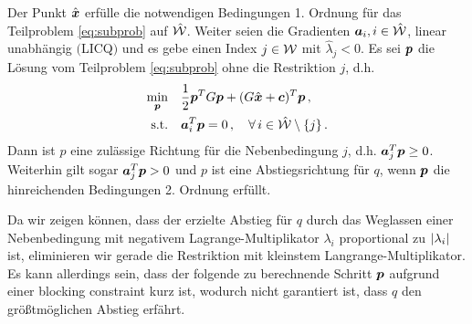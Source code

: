\begin{theorem}
Der Punkt $\hat{\boldsymbol x}$ erfülle die notwendigen Bedingungen 1. Ordnung für das Teilproblem \textnormal{\eqref{eq:subprob}} auf $\hat{\mathcal W}$. Weiter seien die Gradienten $\boldsymbol a_i, i \in \hat{\mathcal W}$, linear unabhängig $($LICQ$)$ und es gebe einen Index $j \in \mathcal W$ mit $\hat \lambda_j<0$. Es sei $\boldsymbol p$ die Lösung vom Teilproblem \textnormal{\eqref{eq:subprob}} ohne die Restriktion $j$, d.h.
\begin{align*}
	\min_{\boldsymbol p} & \quad \frac 1 2\boldsymbol p^T G\boldsymbol p + (G\hat{ \boldsymbol x} +\boldsymbol c)^T\boldsymbol p \, , \\
	\textnormal{s.t.} & \quad\boldsymbol a_i^T\boldsymbol p = 0 \, , \quad  \forall \, i \in \hat{\mathcal W} \setminus \{j\} \, .
\end{align*}
Dann ist $p$ eine zulässige Richtung für die Nebenbedingung $j$, d.h. $\boldsymbol a_j^T \boldsymbol p \ge 0$. Weiterhin gilt sogar $\boldsymbol a_j^T\boldsymbol p > 0$ und $p$ ist eine Abstiegsrichtung für $q$, wenn $\boldsymbol p$ die hinreichenden Bedingungen 2. Ordnung erfüllt.
\end{theorem}

Da wir zeigen können, dass der erzielte Abstieg für $q$ durch das Weglassen einer Nebenbedingung mit negativem Lagrange-Multiplikator $\lambda_i$ proportional zu $\lvert \lambda_i\rvert$ ist, eliminieren wir gerade die Restriktion mit kleinstem Langrange-Multiplikator. Es kann allerdings sein, dass der folgende zu berechnende Schritt $\boldsymbol p$ aufgrund einer {blocking constraint} kurz ist, wodurch nicht garantiert ist, dass $q$ den größtmöglichen Abstieg erfährt.

%


